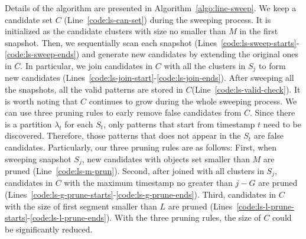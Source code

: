 Details of the algorithm are presented in Algorithm~\ref{algo:line-sweep}. We keep a candidate set $C$ (Line~\ref{code:ls-can-set}) during the sweeping process. It is initialized as the candidate clusters with size no smaller than $M$ in the first snapshot. Then, we sequentially scan each snapshot (Lines~\ref{code:ls-sweep-starts}-\ref{code:ls-sweep-ends}) and generate new candidates by extending the original ones in $C$.
In particular, we join candidates in $C$ with all the clusters in $S_j$ to form new candidates (Lines~\ref{code:ls-join-start}-\ref{code:ls-join-ends}). 
After sweeping all the snapshots, all the valid patterns are stored in $C$(Line~\ref{code:ls-valid-check}). 
It is worth noting that $C$ continues to grow during the whole sweeping process. We can use three pruning rules to 
early remove false candidates from $C$. Since there is a partition $\lambda_t$ for each $S_t$, only patterns that start from timestamp $t$ need to be discovered. Therefore, those patterns that does not appear in the $S_t$ are false candidates. Particularly, our
three pruning rules are as follows:
First, when sweeping snapshot $S_j$, new candidates with objects set smaller than $M$ are pruned (Line~\ref{code:ls-m-prun}). Second, after joined with all clusters in $S_j$, 
candidates in $C$ with the maximum timestamp no greater than $j-G$ are pruned (Lines~\ref{code:ls-g-prune-starts}-\ref{code:ls-g-prune-ends}). Third, candidates in $C$ with the size of first segment smaller than $L$
are pruned (Lines~\ref{code:ls-l-prune-starts}-\ref{code:ls-l-prune-ends}). With the three pruning rules, the size of $C$ could be significantly reduced.  


% 
%
%
%

